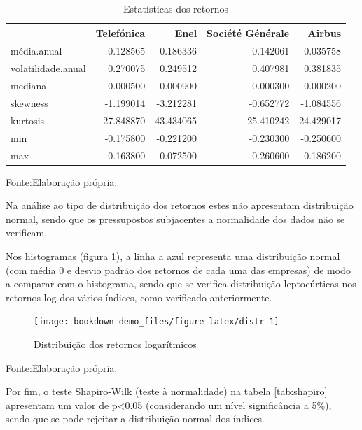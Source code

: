 \documentclass[
  12pt,
  a4paper,
  openany]{book}
\theoremstyle{definition}
\theoremstyle{definition}
\theoremstyle{definition}
\theoremstyle{remark}
\begin{document}
\normalsize

\begin{table}[!h]

\caption{\label{tab:statret}Estatísticas dos retornos}
\centering
\begin{tabular}[t]{lrrrr}
\toprule
  & Telefónica & Enel & Société Générale  & Airbus\\
\midrule
média.anual & -0.128565 & 0.186336 & -0.142061 & 0.035758\\
volatilidade.anual & 0.270075 & 0.249512 & 0.407981 & 0.381835\\
mediana & -0.000500 & 0.000900 & -0.000300 & 0.000200\\
skewness & -1.199014 & -3.212281 & -0.652772 & -1.084556\\
kurtosis & 27.848870 & 43.434065 & 25.410242 & 24.429017\\
\addlinespace
min & -0.175800 & -0.221200 & -0.230300 & -0.250600\\
max & 0.163800 & 0.072500 & 0.260600 & 0.186200\\
\bottomrule
\end{tabular}
\end{table}
\FloatBarrier
\centering

Fonte:Elaboração própria.

\justifying
\bigskip

Na análise ao tipo de distribuição dos retornos estes não apresentam distribuição normal, sendo que os pressupostos subjacentes a normalidade dos dados não se verificam.

Nos histogramas (figura \ref{fig:distr}), a linha a azul representa uma distribuição normal (com média 0 e desvio padrão dos retornos de cada uma das empresas) de modo a comparar com o histograma, sendo que se verifica distribuição leptocúrticas nos retornos log dos vários índices, como verificado anteriormente.

\begin{figure}

{\centering \texttt{[image: bookdown-demo\_files/figure-latex/distr-1]} 

}

\caption{Distribuição dos retornos logarítmicos}\label{fig:distr}
\end{figure}
\FloatBarrier
\centering

Fonte:Elaboração própria.

\justifying
\bigskip

Por fim, o teste Shapiro-Wilk (teste à normalidade) na tabela \ref{tab:shapiro} apresentam um valor de p\textless0.05 (considerando um nível significância a 5\%), sendo que se pode rejeitar a distribuição normal dos índices.
\end{document}

